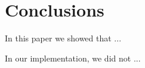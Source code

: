 \section{Conclusions}
\label{sec:conclusions}
In this paper we showed that ...

In our implementation, we did not ...